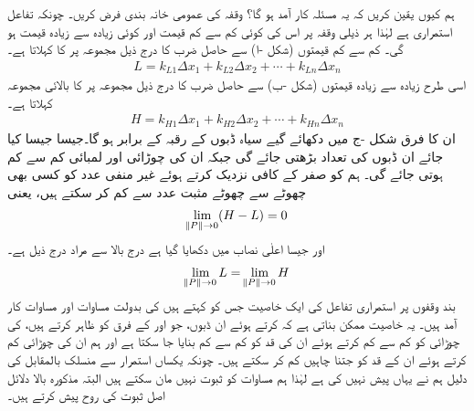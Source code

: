 ہم کیوں یقین کریں کہ یہ مسئلہ کار آمد ہو گا؟ وقفہ  کی عمومی خانہ بندی  فرض کریں۔ چونکہ تفاعل  استمراری ہے لہٰذا ہر ذیلی وقفہ پر اس کی کوئی کم سے کم قیمت   اور کوئی زیادہ سے زیادہ قیمت  ہو گی۔ کم سے کم قیمتوں (شکل -ا) سے حاصل ضرب  کا درج ذیل مجموعہ  پر  کا   کہلاتا ہے۔
\begin{align*}
L=k_{L1}\Delta x_1+k_{L2}\Delta x_2+\cdots+k_{Ln}\Delta x_n
\end{align*}
اسی طرح  زیادہ سے زیادہ قیمتوں (شکل -ب) سے حاصل ضرب  کا درج ذیل مجموعہ  پر  کا بالائی مجموعہ  کہلاتا ہے۔
\begin{align*}
H=k_{H1}\Delta x_1+k_{H2}\Delta x_2+\cdots+k_{Hn}\Delta x_n
\end{align*}
ان کا فرق  شکل -ج میں دکھائے گیے سیاہ ڈبوں کے رقبہ کے برابر ہو گا۔جیسا جیسا  کیا جائے ان ڈبوں کی تعداد بڑھتی جائے گی جبکہ ان کی چوڑائی اور لمبائی کم سے کم ہوتی جائے گی۔ ہم  کو صفر کے کافی نزدیک کرتے ہوئے غیر منفی عدد  کو کسی بھی چھوٹے سے چھوٹے مثبت عدد  سے کم کر سکتے ہیں، یعنی
\begin{align}\label{مساوات_تکمل_ڈبوں_رقبہ_الف}
\lim_{\norm{P}\to 0}(H-L)=0
\end{align}
اور جیسا اعلٰی  نصاب میں دکھایا گیا ہے  درج بالا سے مراد درج ذیل ہے۔
\begin{align}\label{مساوات_تکمل_ڈبوں_رقبہ_ب}
\lim_{\norm{P}\to 0}L=\lim_{\norm{P}\to0}H
\end{align}
بند  وقفوں پر استمراری تفاعل کی ایک خاصیت جس کو  کہتے ہیں کی بدولت مساوات  اور مساوات  کار آمد ہیں۔ یہ خاصیت ممکن بناتی ہے کہ  کرتے ہوئے ان ڈبوں، جو  اور  کے فرق کو ظاہر کرتے ہیں،  کی چوڑائی کو کم سے کم کرتے ہوئے ان کی قد کو کم سے کم بنایا جا سکتا ہے اور ہم ان کی چوڑائی کم کرتے ہوئے ان کے قد کو جتنا چاہیں کم کر سکتے ہیں۔ چونکہ یکساں استمرار سے منسلک  بالمقابل  کی دلیل ہم نے یہاں پیش نہیں کی ہے لہٰذا ہم مساوات   کو ثبوت نہیں مان سکتے ہیں البتہ مذکورہ بالا دلائل اصل ثبوت کی روح پیش کرتے ہیں۔

